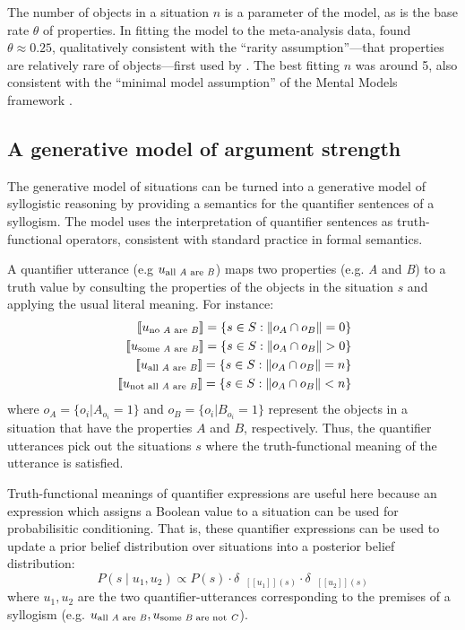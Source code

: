 \documentclass[floatsintext, man]{apa6}
\newcommand{\denote}[1]{\mbox{ $[\![ #1 ]\!]$}}
\begin{document}
The number of objects in a situation $n$ is a parameter of the model, as is the base rate $\theta$ of properties. In fitting the model to the meta-analysis data,  found $\theta \approx 0.25$, qualitatively consistent with the ``rarity assumption''---that properties are relatively rare of objects---first used by . The best fitting $n$ was around 5, also consistent with the ``minimal model assumption'' of the Mental Models framework \cite{JL1983}.


\subsection{A generative model of argument strength}

The generative model of situations can be turned into a generative model of syllogistic reasoning by providing a semantics for the quantifier sentences of a syllogism. The model uses the interpretation of quantifier sentences as truth-functional operators, consistent with standard practice in formal semantics. 

A quantifier utterance (e.g $u_{\textrm{all \emph{A} are \emph{B}}}$) maps two properties (e.g. \emph{A} and \emph{B}) to a truth value by consulting the properties of the objects in the situation $s$ and applying the usual literal meaning. For instance:
\begin{align*}
\denote{u_{\textrm{no  \emph{A} are \emph{B}}}}= \{s \in S : \| o_A \cap o_B \| = 0\}\\ 
\denote{u_{\textrm{some  \emph{A} are \emph{B}}}}= \{s \in S: \| o_A \cap o_B \|> 0\}\\
\denote{u_{\textrm{all  \emph{A} are \emph{B}}}}= \{s \in S: \| o_A \cap o_B \| = n\}\\
\denote{u_{\textrm{not all  \emph{A} are \emph{B}}}}= \{s \in S: \| o_A \cap o_B \|< n\}
\end{align*}
%
where $o_A = \{o_i | A_{o_{i}} = 1\} $ and $o_B = \{o_i | B_{o_{i}} = 1\} $ represent the objects in a situation that have the properties $A$ and $B$, respectively.
Thus, the quantifier utterances pick out the situations $s$ where the truth-functional meaning of the utterance is satisfied. 
 
Truth-functional meanings of quantifier expressions are useful here because an expression which assigns a Boolean value to a situation can be used for probabilisitic conditioning. That is, these quantifier expressions can be used to update a prior belief distribution over situations into a posterior belief distribution: 
$$P(s \mid u_1, u_2) \propto P(s)\cdot \delta_{\denote{u_1}(s)} \cdot \delta_{\denote{u_2}(s)} $$
where $u_1, u_2$ are the two quantifier-utterances corresponding to the premises of a syllogism (e.g. $u_{\textrm{all  \emph{A} are \emph{B}}}, u_{\textrm{some  \emph{B} are not \emph{C}}}$).
\end{document}
